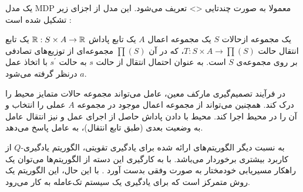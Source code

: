 یک مدل MDP معمولا به صورت چندتایی <> تعریف می‌شود. این مدل از اجزای زیر
تشکیل شده است \cite{Kaelbling1996}:


  یک مجموعه ازحالات $S$
  یک مجموعه اعمال $A$
 یک تابع پاداش ${\Bbb R}: S \times A \rightarrow {\Bbb R}$
 یک تابع انتقال حالت $T: S \times A \rightarrow \prod(S)$، که در آن $\prod(S)$ مجموعه‌ای از توزیع‌های تصادفی بر
روی مجموعه‌ی $S$ است.  به عنوان احتمال انتقال از حالت $s$ به حالت $s^{\prime}$ با اتخاذ عمل $a$ درنظر گرفته می‌شود.


در فرآیند تصمیم‌گیری مارکف معین، عامل می‌تواند مجموعه حالات متمایز محیط را درک کند. همچنین می‌تواند از مجموعه اعمال موجود در مجموعه $A$ عملی را انتخاب و آن را در محیط اجرا کند. محیط با دادن پاداش حاصل از اجرای عمل و نیز انتقال عامل به وضعیت بعدی (طبق تابع انتقال)، به عامل پاسخ می‌دهد.

به نسبت دیگر الگوریتم‌های ارائه شده برای یادگیری تقویتی، الگوریتم یادگیری-$Q$ از کاربرد بیشتری برخوردار می‌باشد. با به کارگیری این دسته از الگوریتم‌ها می‌توان یک راهکار مسیریابی خودمختار به صورت وفقی بدست آورد \cite{Nedzelnitsky1987}. با این حال، این الگوریتم یک روش متمرکز است که برای
یادگیری یک سیستم تک‌عامله به کار می‌رود.



